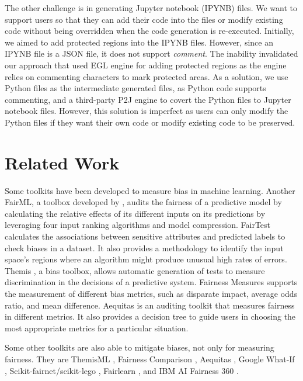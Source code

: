 \documentclass[sigconf,review]{acmart}
\begin{document}
{	The other challenge is in generating Jupyter notebook (IPYNB) files. We want to support users so that they can add their code into the files or modify existing code without being overridden when the code generation is re-executed. Initially, we aimed to add protected regions into the IPYNB files. However, since an IPYNB file is a JSON file, it does not support \textit{comment}. The inability invalidated our approach that used EGL engine \cite{rose2008egl} for adding protected regions as the engine relies on commenting characters to mark protected areas. As a solution, we use Python files as the intermediate generated files, as Python code supports commenting, and a third-party P2J engine to covert the Python files to Jupyter notebook files. However, this solution is imperfect as users can only modify the Python files if they want their own code or modify existing code to be preserved.
	
	\section{Related Work}
	\label{sec:related_work}
	
	Some toolkits have been developed to measure bias in machine learning. 
	Another FairML, a toolbox developed by \cite{adebayo2016fairml}, audits the fairness of a predictive model by calculating the relative effects of its different inputs on its predictions by leveraging four input ranking algorithms and model compression. 
	FairTest \cite{tramer2017fairtest} calculates the associations between sensitive attributes and predicted labels to check biases in a dataset. It also provides a methodology to identify the input space's regions where an algorithm might produce unusual high rates of errors.
	Themis \cite{galhotra2017themis}, a bias toolbox, allows automatic generation of tests to measure discrimination in the decisions of a predictive system.
	Fairness Measures \cite{zehlike2017fairness} supports the measurement of different bias metrics, such as disparate impact, average odds ratio, and mean difference. 
	Aequitas \cite{saleiro2019aequitas} is an auditing toolkit that measures fairness in different metrics. It also provides a decision tree to guide users in choosing the most appropriate metrics for a particular situation. 
	
	Some other toolkits are also able to mitigate biases, not only for measuring fairness. They are ThemisML \cite{bantilan2018themis}, Fairness Comparison \cite{friedler2019fairness}, Aequitas \cite{saleiro2019aequitas}, Google What-If \cite{googlewhatif2020}, Scikit-fairnet/scikit-lego \cite{scikitfairness2022,scikitlego2022}, Fairlearn \cite{bird2020fairlearn}, and IBM AI Fairness 360 \cite{bellamy2018ai}.
	
}
\end{document}
